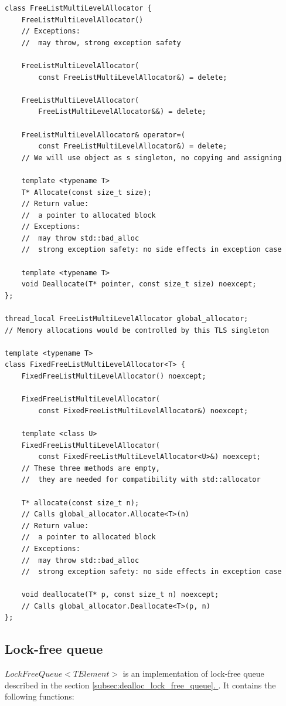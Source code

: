 \documentclass{article}
\newcommand*{\fullref}[1]{\hyperref[{#1}]{\ref*{#1}. \nameref*{#1}}}
\begin{document}
\begin{lstlisting}
class FreeListMultiLevelAllocator {
	FreeListMultiLevelAllocator()
	// Exceptions:
	// 	may throw, strong exception safety

	FreeListMultiLevelAllocator(
		const FreeListMultiLevelAllocator&) = delete;

	FreeListMultiLevelAllocator(
		FreeListMultiLevelAllocator&&) = delete;

	FreeListMultiLevelAllocator& operator=(
		const FreeListMultiLevelAllocator&) = delete;
	// We will use object as s singleton, no copying and assigning

	template <typename T>
	T* Allocate(const size_t size);
	// Return value:
	// 	a pointer to allocated block
	// Exceptions:
	// 	may throw std::bad_alloc
	// 	strong exception safety: no side effects in exception case

	template <typename T>
	void Deallocate(T* pointer, const size_t size) noexcept;
};

thread_local FreeListMultiLevelAllocator global_allocator;
// Memory allocations would be controlled by this TLS singleton

template <typename T>
class FixedFreeListMultiLevelAllocator<T> {
	FixedFreeListMultiLevelAllocator() noexcept;

	FixedFreeListMultiLevelAllocator(
		const FixedFreeListMultiLevelAllocator&) noexcept;

	template <class U>
	FixedFreeListMultiLevelAllocator(
		const FixedFreeListMultiLevelAllocator<U>&) noexcept;
	// These three methods are empty,
	// 	they are needed for compatibility with std::allocator

	T* allocate(const size_t n);
	// Calls global_allocator.Allocate<T>(n)
	// Return value:
	// 	a pointer to allocated block
	// Exceptions:
	// 	may throw std::bad_alloc
	// 	strong exception safety: no side effects in exception case

	void deallocate(T* p, const size_t n) noexcept;
	// Calls global_allocator.Deallocate<T>(p, n)
};
\end{lstlisting}

\subsection{Lock-free queue}

$LockFreeQueue<TElement>$ is an implementation of lock-free queue described in the section \fullref{subsec:dealloc_lock_free_queue}. It contains the following functions:
\end{document}
